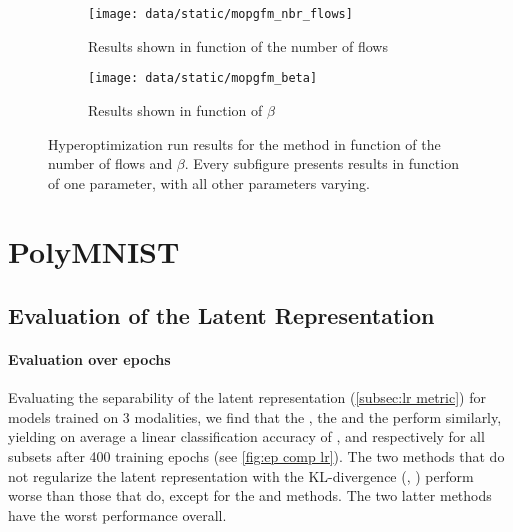 \begin{figure}
    \centering
    \begin{subfigure}[b]{0.9\textwidth}
        \centering
        \texttt{[image: data/static/mopgfm\_nbr\_flows]}
        \caption{Results shown in function of the number of flows}
        \label{subfig:mopgfm_nbr_flows}
    \end{subfigure}
    \hfill
    \begin{subfigure}[b]{0.9\textwidth}
        \centering
        \texttt{[image: data/static/mopgfm\_beta]}
        \caption{Results shown in function of $\beta$}
    \end{subfigure}
    \caption{Hyperoptimization run results for the  method in function of the number of flows and $\beta$. Every subfigure presents results in function of one parameter, with all other parameters varying.}
    \label{fig:mopgfm hyperopt2}
\end{figure}


\section{PolyMNIST} \label{subsec: results polymnist}

\subsection{Evaluation of the Latent Representation}

\paragraph{Evaluation over epochs}
Evaluating the separability of the latent representation (\cref{subsec:lr metric}) for models trained on 3 modalities, we find that the , the  and the  perform similarly, yielding on average a linear classification accuracy of ,  and  respectively for all subsets after 400 training epochs (see \cref{fig:ep comp lr}).
The two methods that do not regularize the latent representation with the KL-divergence (, ) perform worse than those that do, except for the  and  methods.
The two latter methods have the worst performance overall.


\begin{sansmath}
\end{sansmath}

